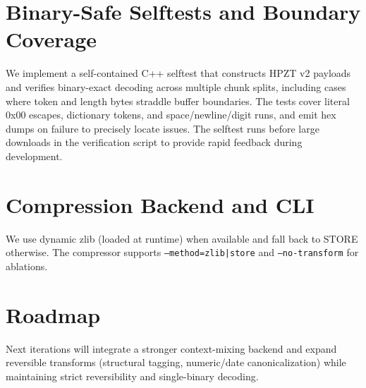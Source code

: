\documentclass[11pt]{article}
\begin{document}
\section{Binary-Safe Selftests and Boundary Coverage}
We implement a self-contained C++ selftest that constructs HPZT v2 payloads and verifies binary-exact decoding across multiple chunk splits, including cases where token and length bytes straddle buffer boundaries. The tests cover literal 0x00 escapes, dictionary tokens, and space/newline/digit runs, and emit hex dumps on failure to precisely locate issues. The selftest runs before large downloads in the verification script to provide rapid feedback during development.

\section{Compression Backend and CLI}
We use dynamic zlib (loaded at runtime) when available and fall back to STORE otherwise. The compressor supports \texttt{--method=zlib|store} and \texttt{--no-transform} for ablations.

\section{Roadmap}
Next iterations will integrate a stronger context-mixing backend and expand reversible transforms (structural tagging, numeric/date canonicalization) while maintaining strict reversibility and single-binary decoding.
\end{document}
